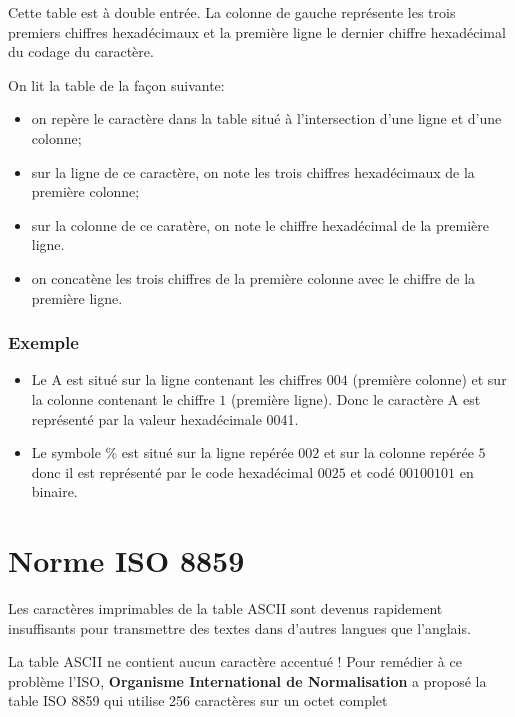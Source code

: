 \documentclass[11pt]{article}
\providecommand{\tightlist}{%
      \setlength{\itemsep}{0pt}\setlength{\parskip}{0pt}}
\begin{document}
Cette table est à double entrée. La colonne de gauche représente les
trois premiers chiffres hexadécimaux et la première ligne le dernier
chiffre hexadécimal du codage du caractère.

On lit la table de la façon suivante:

\begin{itemize}
\tightlist
\item
  on repère le caractère dans la table situé à l'intersection d'une
  ligne et d'une colonne;
\item
  sur la ligne de ce caractère, on note les trois chiffres hexadécimaux
  de la première colonne;
\item
  sur la colonne de ce caratère, on note le chiffre hexadécimal de la
  première ligne.
\item
  on concatène les trois chiffres de la première colonne avec le chiffre
  de la première ligne.
\end{itemize}

\hypertarget{exemple-1}{%
\subsubsection*{Exemple}\label{exemple-1}}

\begin{itemize}
\tightlist
\item
  Le A est situé sur la ligne contenant les chiffres \(004\) (première
  colonne) et sur la colonne contenant le chiffre \(1\) (première
  ligne). Donc le caractère A est représenté par la valeur hexadécimale
  0041.
\item
  Le symbole \% est situé sur la ligne repérée \(002\) et sur la colonne
  repérée \(5\) donc il est représenté par le code hexadécimal \(0025\)
  et codé \(00100101\) en binaire.
\end{itemize}

\hypertarget{norme-iso-8859}{%
\section{Norme ISO 8859}\label{norme-iso-8859}}

Les caractères imprimables de la table ASCII sont devenus rapidement
insuffisants pour transmettre des textes dans d'autres langues que
l'anglais.

La table ASCII ne contient aucun caractère accentué ! Pour remédier à ce
problème l'ISO, \textbf{Organisme International de Normalisation} a
proposé la table ISO 8859 qui utilise 256 caractères sur un octet
complet
\end{document}
